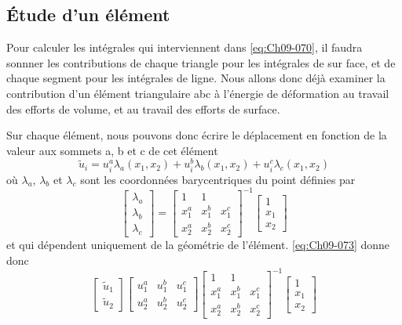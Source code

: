 \subsection{Étude d'un élément} \label{ssec:Ch09-3.3}
Pour calculer les intégrales qui interviennent dans \eqref{eq:Ch09-070}, il faudra sonnner les contributions de chaque triangle pour les intégrales de sur face, et de chaque segment pour les intégrales de ligne.
Nous allons donc déjà examiner la contribution d'un élément triangulaire abc à l'énergie de déformation au travail des efforts de volume, et au travail des efforts de surface. 

Sur chaque élément, nous pouvons donc écrire le déplacement en fonction de la valeur aux sommets a, b et c de cet élément 
\begin{equation}
    \tilde{u}_i = u_i^a \lambda_a \left( x_1, x_2 \right) + u_i^b \lambda_b \left( x_1, x_2 \right) + u_i^c \lambda_c \left( x_1, x_2 \right)
    \label{eq:Ch09-073}
\end{equation}
où $\lambda_a$, $\lambda_b$ et $\lambda_c$ sont les coordonnées barycentriques du point définies par 
\begin{equation}
    \begin{bmatrix}
        \lambda_a\\
        \lambda_b\\
        \lambda_c
    \end{bmatrix}
    =
    \begin{bmatrix}
        1 & 1 & \\
        x_1^a & x_1^b & x_1^c \\
        x_2^a & x_2^b & x_2^c
    \end{bmatrix}^{-1}
    \begin{bmatrix}
        1 \\
        x_1 \\
        x_2
    \end{bmatrix}
    \label{eq:Ch09-074}
\end{equation}
et qui dépendent uniquement de la géométrie de l'élément.
\eqref{eq:Ch09-073} donne donc
\begin{equation}
    \begin{bmatrix}
        \tilde{u}_1 \\
        \tilde{u}_2
    \end{bmatrix}
    \begin{bmatrix}
        u_1^a & u_1^b & u_1^c \\
        u_2^a & u_2^b & u_2^c
    \end{bmatrix}
    \begin{bmatrix}
        1 & 1 & \\
        x_1^a & x_1^b & x_1^c \\
        x_2^a & x_2^b & x_2^c
    \end{bmatrix}^{-1}
    \begin{bmatrix}
        1 \\
        x_1 \\
        x_2
    \end{bmatrix}
    \label{eq:Ch09-075}
\end{equation}

